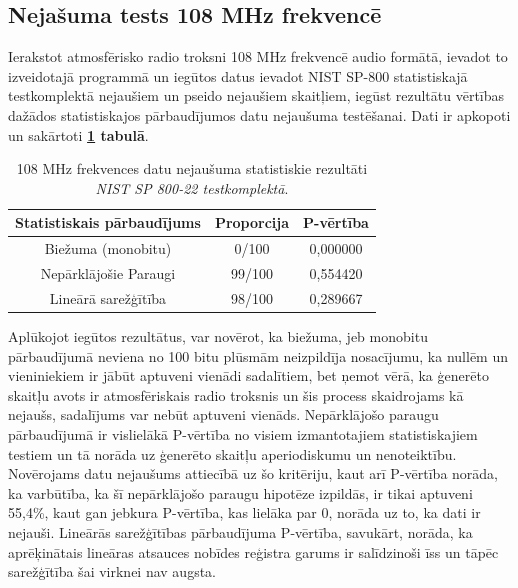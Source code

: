 \documentclass[12pt]{article}
\begin{document}
    \subsection{Nejašuma tests 108 MHz frekvencē}
    Ierakstot atmosfērisko radio troksni 108 MHz frekvencē audio formātā, ievadot to izveidotajā programmā un iegūtos datus ievadot NIST SP-800 statistiskajā testkomplektā nejaušiem un pseido nejaušiem skaitļiem, iegūst rezultātu vērtības dažādos statistiskajos pārbaudījumos datu nejaušuma testēšanai. Dati ir apkopoti un sakārtoti \textbf{\ref{rezultati_108} tabulā}.

\begin{table}[!ht]
\centering


\begin{tabular}{ |c|c|c| }%
\hline
Statistiskais pārbaudījums & Proporcija & P-vērtība \\
\hline
Biežuma (monobitu) & 0/100 & 0,000000\\
\hline
Nepārklājošie Paraugi & 99/100 & 0,554420 \\
\hline
Lineārā sarežģītība & 98/100 & 0,289667 \\
\hline
\end{tabular}

\caption{108 MHz frekvences datu nejaušuma statistiskie rezultāti \\ \emph{NIST SP 800-22 testkomplektā}.\parencite{NIST_orig}}

\label{rezultati_108}
\end{table}

  \FloatBarrier
    
    Aplūkojot iegūtos rezultātus, var novērot, ka  biežuma, jeb monobitu pārbaudījumā neviena no 100 bitu plūsmām neizpildīja nosacījumu, ka nullēm un vieniniekiem ir jābūt aptuveni vienādi sadalītiem, bet ņemot vērā, ka ģenerēto skaitļu avots ir atmosfēriskais radio troksnis un šis process skaidrojams kā nejaušs, sadalījums var nebūt aptuveni vienāds. Nepārklājošo paraugu pārbaudījumā ir vislielākā P-vērtība no visiem izmantotajiem statistiskajiem testiem un tā norāda uz ģenerēto skaitļu aperiodiskumu un nenoteiktību. Novērojams datu nejaušums attiecībā uz šo kritēriju, kaut arī P-vērtība norāda, ka varbūtība, ka šī nepārklājošo paraugu hipotēze izpildās, ir tikai aptuveni 55,4\%, kaut gan jebkura P-vērtība, kas lielāka par 0, norāda uz to, ka dati ir nejauši.
    Lineārās sarežģītības pārbaudījuma P-vērtība, savukārt, norāda, ka aprēķinātais lineāras atsauces nobīdes reģistra garums ir salīdzinoši īss un tāpēc sarežģītība šai virknei nav augsta.
\end{document}
